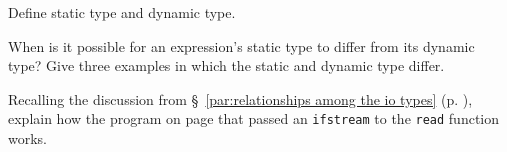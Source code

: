 %
%
\begin{question}
Define static type and dynamic type.
\end{question}

\begin{question}
When is it possible for an expression’s static type to differ
from its dynamic type? Give three examples in which the static and dynamic type differ.
\end{question}

\begin{question}
Recalling the discussion from \S~\ref{par:relationships among the io types} (p. \pageref{par:relationships among the io types}), explain how the program on page \pageref{lst:use fstream in place of iostream} that passed an \verb|ifstream| to the
\verb|read| function works.
\end{question}
